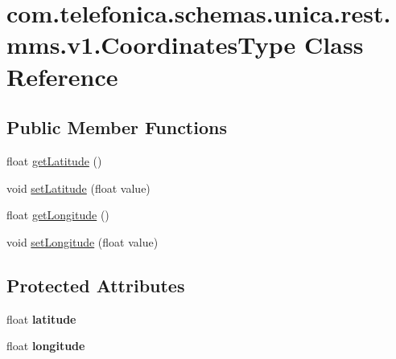 \hypertarget{classcom_1_1telefonica_1_1schemas_1_1unica_1_1rest_1_1mms_1_1v1_1_1CoordinatesType}{
\section{com.telefonica.schemas.unica.rest.mms.v1.CoordinatesType Class Reference}
\label{classcom_1_1telefonica_1_1schemas_1_1unica_1_1rest_1_1mms_1_1v1_1_1CoordinatesType}
}
\subsection*{Public Member Functions}
\begin{DoxyCompactItemize}
\item 
float \hyperlink{classcom_1_1telefonica_1_1schemas_1_1unica_1_1rest_1_1mms_1_1v1_1_1CoordinatesType_a140e7e4a5ceb98dd413ad8f98134bc3c}{getLatitude} ()
\item 
void \hyperlink{classcom_1_1telefonica_1_1schemas_1_1unica_1_1rest_1_1mms_1_1v1_1_1CoordinatesType_affd8c464ea249052962f2b843caf10e7}{setLatitude} (float value)
\item 
float \hyperlink{classcom_1_1telefonica_1_1schemas_1_1unica_1_1rest_1_1mms_1_1v1_1_1CoordinatesType_a24b53ab4603a36d346866893ed622ddd}{getLongitude} ()
\item 
void \hyperlink{classcom_1_1telefonica_1_1schemas_1_1unica_1_1rest_1_1mms_1_1v1_1_1CoordinatesType_a5cab6d2bc5de00016031087950480cd2}{setLongitude} (float value)
\end{DoxyCompactItemize}
\subsection*{Protected Attributes}
\begin{DoxyCompactItemize}
\item 
\hypertarget{classcom_1_1telefonica_1_1schemas_1_1unica_1_1rest_1_1mms_1_1v1_1_1CoordinatesType_a7b2c1945a8885d6e8c16178fe00220d3}{
float {\bfseries latitude}}
\label{classcom_1_1telefonica_1_1schemas_1_1unica_1_1rest_1_1mms_1_1v1_1_1CoordinatesType_a7b2c1945a8885d6e8c16178fe00220d3}

\item 
\hypertarget{classcom_1_1telefonica_1_1schemas_1_1unica_1_1rest_1_1mms_1_1v1_1_1CoordinatesType_af227232f8b5213a38254505e9d6bbc07}{
float {\bfseries longitude}}
\label{classcom_1_1telefonica_1_1schemas_1_1unica_1_1rest_1_1mms_1_1v1_1_1CoordinatesType_af227232f8b5213a38254505e9d6bbc07}

\end{DoxyCompactItemize}


